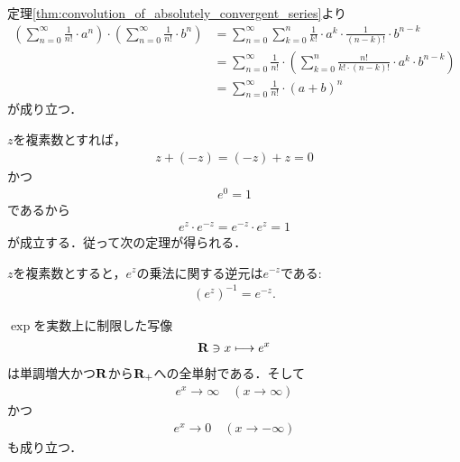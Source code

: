 	\begin{sketch}
		定理\ref{thm:convolution_of_absolutely_convergent_series}より
		\begin{align}
			\left(\sum_{n=0}^\infty \frac{1}{n!} \cdot a^n\right) \cdot \left(\sum_{n=0}^\infty \frac{1}{n!} \cdot b^n\right)
			&= \sum_{n=0}^\infty \sum_{k=0}^n \frac{1}{k!} \cdot a^k \cdot \frac{1}{(n-k)!} \cdot b^{n-k} \\
			&= \sum_{n=0}^\infty \frac{1}{n!} \cdot \left( \sum_{k=0}^n \frac{n!}{k! \cdot (n-k)!} \cdot a^k \cdot b^{n-k} \right) \\
			&= \sum_{n=0}^\infty \frac{1}{n!} \cdot (a+b)^n
		\end{align}
		が成り立つ．
		\QED
	\end{sketch}
	
	$z$を複素数とすれば，
	\begin{align}
		z + (-z) = (-z) + z = 0
	\end{align}
	かつ
	\begin{align}
		e^0 = 1
	\end{align}
	であるから
	\begin{align}
		e^z \cdot e^{-z} = e^{-z} \cdot e^z = 1
	\end{align}
	が成立する．従って次の定理が得られる．
	
	\begin{screen}
		\begin{thm}[$e$のマイナス乗は逆元]\label{thm:inversion_of_exp_z_is_exp_minus_z}
			$z$を複素数とすると，$e^z$の乗法に関する逆元は$e^{-z}$である:
			\begin{align}
				(e^z)^{-1} = e^{-z}.
			\end{align}
		\end{thm}
	\end{screen}
	
	\begin{screen}
		\begin{thm}[指数関数は実数上で単調増大かつ一対一対応]\label{thm:real_valued_exponential_function}
			$\exp$を実数上に制限した写像
			\begin{align}
				\mathbf{R} \ni x \longmapsto e^x
			\end{align}
			は単調増大かつ$\mathbf{R}$から$\mathbf{R}_+$への全単射である．そして
			\begin{align}
				e^x \longrightarrow \infty \quad (x \longrightarrow \infty)
			\end{align}
			かつ
			\begin{align}
				e^x \longrightarrow 0 \quad (x \longrightarrow -\infty)
			\end{align}
			も成り立つ．
		\end{thm}
	\end{screen}
	
